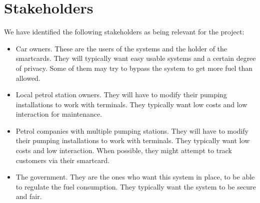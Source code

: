 \section*{Stakeholders}
We have identified the following stakeholders as being relevant for the project:
\begin{itemize}
\item Car owners. These are the users of the systems and the holder of the smartcards.
They will typically want easy usable systems and a certain degree of privacy. 
Some of them may try to bypass the system to get more fuel than allowed.

\item Local petrol station owners. They will have to modify their pumping installations to 
work with terminals. They typically want low costs and low interaction for maintenance.

\item Petrol companies with multiple pumping stations. They will have to modify their
pumping installations to work with terminals. They typically want low costs and 
low interaction. When possible, they might attempt to track customers via their smartcard.

\item The government. They are the ones who want this system in place, to be able to regulate
the fuel consumption. They typically want the system to be secure and fair.
\end{itemize}

